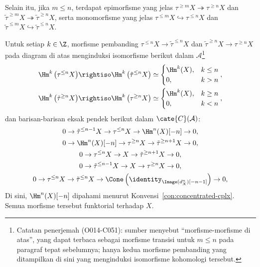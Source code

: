 Selain itu, jika $m \leq n$, terdapat epimorfisme yang jelas
$\tau^{\geq m} X \twoheadrightarrow \tau^{\geq n} X$ dan
$\tilde{\tau}^{\geq m} X \twoheadrightarrow \tilde{\tau}^{\geq n} X$,
serta monomorfisme yang jelas
$\tau^{\leq m} X \hookrightarrow \tau^{\leq n} X$ dan
$\tilde{\tau}^{\leq m} X \hookrightarrow \tilde{\tau}^{\leq n} X$.

\begin{lema}\label{prop:truncation-ses}
	Untuk setiap $k \in \Z$, morfisme pembanding
	$\tau^{\leq n}X \to \tilde{\tau}^{\leq n}X$ dan
	$\tilde{\tau}^{\geq n}X \to \tau^{\geq n}X$ pada diagram di atas
	menginduksi isomorfisme berikut dalam $\mathcal{A}$\footnote{Catatan
	penerjemah (O014-C051): sumber menyebut ``morfisme-morfisme di atas'', yang
	dapat terbaca sebagai morfisme transisi untuk $m \leq n$ pada paragraf
	tepat sebelumnya; hanya kedua morfisme pembanding yang ditampilkan di sini
	yang menginduksi isomorfisme kohomologi tersebut.}
	\begin{align*}
		\Hm^k\left( \tau^{\leq n} X\right) & \rightiso \Hm^k\left( \tilde{\tau}^{\leq n} X\right) \simeq \begin{cases} \Hm^k(X), & k \leq n \\ 0, & k > n \end{cases}, \\
		\Hm^k\left( \tilde{\tau}^{\geq n} X\right) & \rightiso \Hm^k\left( \tau^{\geq n} X\right) \simeq \begin{cases} \Hm^k(X), & k \geq n \\ 0, & k < n \end{cases},
	\end{align*}
	dan barisan-barisan eksak pendek berikut dalam
	$\cate{C}(\mathcal{A})$:
	\begin{equation*}\begin{gathered}
		0 \to \tilde{\tau}^{\leq n-1} X \to \tau^{\leq n} X \to \Hm^n(X)[-n] \to 0, \\
		0 \to \Hm^n(X)[-n] \to \tau^{\geq n} X \to \tilde{\tau}^{\geq n+1} X \to 0, \\
		0 \to \tau^{\leq n} X \to X \to \tilde{\tau}^{\geq n+1} X \to 0, \\
		0 \to \tilde{\tau}^{\leq n-1} X \to X \to \tau^{\geq n} X \to 0, \\
		0 \to \tau^{\leq n} X \to \tilde{\tau}^{\leq n} X \to \Cone\left(\identity_{\Image(d_X^n) [-n-1]} \right) \to 0,
	\end{gathered}\end{equation*}
	Di sini, $\Hm^n(X)[-n]$ dipahami menurut
	Konvensi~\ref{con:concentrated-cplx}. Semua morfisme tersebut funktorial
	terhadap $X$.
\end{lema}
